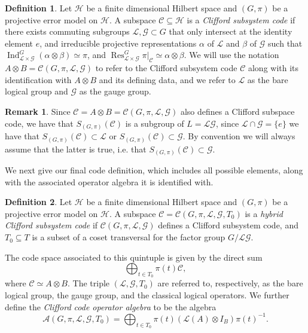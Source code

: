 \documentclass[11pt]{article}
\theoremstyle{definition}
\newtheorem{definition}{Definition}
\newtheorem*{remark}{Remark}
\newcommand{\calC}{\mathcal{C}}
\newcommand{\calG}{\mathcal{G}}
\newcommand{\calH}{\mathcal{H}}
\newcommand{\calL}{\mathcal{L}}
\newcommand{\Ind}{\operatorname{Ind}}
\newcommand{\Res}{\operatorname{Res}}
\begin{document}
\begin{definition}\label{def:Clifford subsystem code}
    Let $\calH$ be a finite dimensional Hilbert space and $(G,\pi)$ be a projective error model on $\calH$. A subspace $\calC \subseteq \calH$ is a \emph{Clifford subsystem code} if there exists commuting subgroups $\calL,\calG \subset G$ that only intersect at the identity element $e$, and irreducible projective representations $\alpha$ of $\calL$ and $\beta$ of $\calG$ such that $\Ind_{\calL \times \calG}^G(\alpha \otimes \beta) \simeq \pi$, and $\Res^G_{\calL \times \calG}\pi|_\calC \simeq \alpha \otimes \beta$. We will use the notation $A \otimes B = \calC(G,\pi,\calL,\calG)$ to refer to the Clifford subsystem code $\calC$ along with its identification with $A \otimes B$ and its defining data, and we refer to $\mathcal L$ as the bare logical group and $\mathcal G$ as the gauge group.
\end{definition}

\begin{remark}
    Since $\calC = A \otimes B = \calC(G,\pi,\calL,\calG)$ also defines a Clifford subspace code, we have that $S_{(G,\pi)}(\calC)$ is a subgroup of $L = \calL\calG$, since $\calL \cap \calG = \{e\}$ we have that $S_{(G,\pi)}(\calC) \subset \calL$ or $S_{(G,\pi)}(\calC) \subset \calG$. By convention we will always assume that the latter is true, i.e. that $S_{(G,\pi)}(\calC) \subset \calG$.
\end{remark}

We next give our final code definition, which includes all possible elements, along with the associated operator algebra it is identified with. 

\begin{definition}\label{def:hybrid Clifford subsystem code}
    Let $\calH$ be a finite dimensional Hilbert space and $(G,\pi)$ be a projective error model on $\calH$. A subspace $\calC = \calC(G,\pi,\calL,\calG,T_0)$ is a \emph{hybrid Clifford subsystem code} if $\calC(G,\pi,\calL,\calG)$ defines a Clifford subsystem code, and $T_0 \subseteq T$ is a subset of a coset transversal for the factor group $G/\calL\calG$.
    
    The code space associated to this quintuple is given by the direct sum
    \[
        \bigoplus_{t \in T_0} \pi(t)\calC,
    \]
    where $\calC \simeq A \otimes B$. 
    The triple $(\mathcal L, \mathcal G, T_0)$ are referred to, respectively, as the bare logical group, the gauge group, and the classical logical operators. 
    We further define the {\it Clifford code operator algebra} to be the algebra 
    \[
        \mathcal A (G,\pi,\calL,\calG,T_0) = \bigoplus_{t \in T_0} \pi(t) ( \mathcal L(A) \otimes I_{B}  ) \pi(t)^{-1} .
    \]
\end{definition} 
\end{document}
